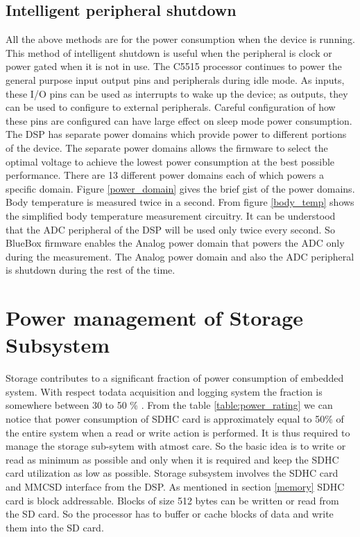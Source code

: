 \subsection{Intelligent peripheral shutdown}
All the above methods are for the power consumption when the device is running. This method of intelligent shutdown is useful when the peripheral is clock or power gated when it is not in use. The C5515 processor continues to power the general purpose input output pins and peripherals during idle mode. As inputs, these I/O pins can be used as interrupts to wake 
up the device; as outputs, they can be used to configure to external peripherals. Careful configuration of how these pins are configured can have large effect on sleep mode power consumption. 
The DSP has separate power domains which provide power to different portions of the device. The separate power domains allows the firmware to select the optimal voltage to achieve the lowest power consumption at the best possible performance. There are 13 different power domains each of which powers a specific domain. Figure \ref{power_domain} gives the brief gist of the power domains.
Body temperature is measured twice in a second. From figure \ref{body_temp} shows the simplified body temperature measurement circuitry. It can be understood that the ADC peripheral of the DSP will be used only twice every second. So BlueBox firmware enables the Analog power domain that powers the ADC only during the measurement. The Analog power domain and also the ADC peripheral is shutdown during the rest of the time. 

\section{Power management of Storage Subsystem}
Storage contributes to a significant fraction of power consumption of embedded system. With respect todata acquisition and logging system the fraction is somewhere between 30 to 50 \% . From the table \ref{table:power_rating} we can notice that power consumption of SDHC card is approximately equal to 50\% of the entire system when a read or write action is performed. It is thus required to manage the storage sub-sytem with atmost care. So the basic idea is to write or read as minimum as possible and only when it is required and keep the SDHC card utilization as low as possible.
Storage subsystem involves the SDHC card and MMCSD interface from the DSP. As mentioned in section \ref{memory} SDHC card is block addressable. Blocks of size 512 bytes can be written or read from the SD card. So the processor has to buffer or cache blocks of data and write them into the SD card.  

